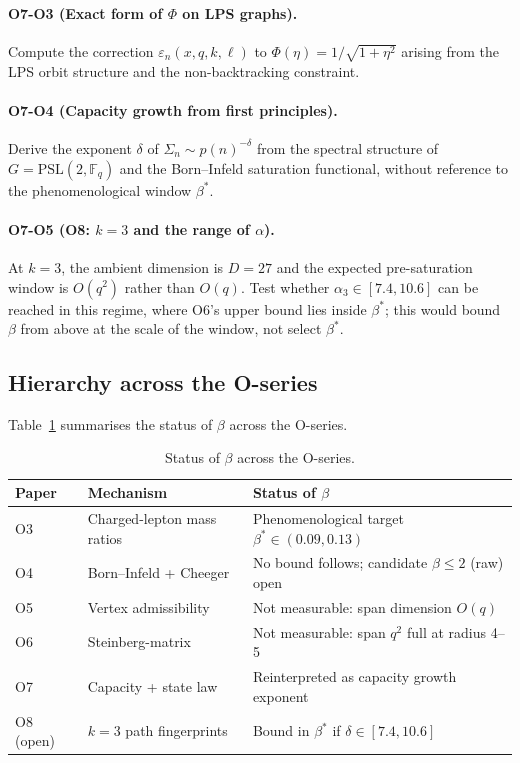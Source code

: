 \documentclass[11pt,a4paper]{article}
\theoremstyle{definition}
\theoremstyle{remark}
\newcommand{\PSL}{\mathrm{PSL}(2,\mathbb{F}_q)}
\begin{document}
    \paragraph{O7-O3 (Exact form of $\Phi$ on LPS graphs).}
      Compute the correction $\varepsilon_n(x,q,k,\ell)$ to $\Phi(\eta) = 1/\sqrt{1+\eta^2}$
      arising from the LPS orbit structure and the non-backtracking constraint.

    \paragraph{O7-O4 (Capacity growth from first principles).}
      Derive the exponent $\delta$ of $\Sigma_n \sim p(n)^{-\delta}$ from the spectral structure
      of $G = \PSL$ and the Born--Infeld saturation functional,
      without reference to the phenomenological window $\beta^*$.

    \paragraph{O7-O5 (O8: $k = 3$ and the range of $\alpha$).}
      At $k = 3$, the ambient dimension is $D = 27$ and the expected pre-saturation window is
      $O(q^2)$ rather than $O(q)$.
      Test whether $\alpha_3 \in [7.4, 10.6]$ can be reached in this regime, where O6's upper bound
      lies inside $\beta^*$; this would bound $\beta$ from above at the scale of the window, not
      select $\beta^*$.

  \subsection{Hierarchy across the O-series}
  \label{ssec:hierarchy-table}

  Table~\ref{tab:hierarchy} summarises the status of $\beta$ across the O-series.

  \begin{table}[ht]
    \centering
    \small
    \caption{Status of $\beta$ across the O-series.}
    \label{tab:hierarchy}
    \begin{tabular}{lll}
      \toprule
      Paper     & Mechanism                  & Status of $\beta$                                 \\
      \midrule
      O3        & Charged-lepton mass ratios & Phenomenological target $\beta^* \in (0.09,0.13)$ \\
      O4        & Born--Infeld + Cheeger     & No bound follows; candidate $\beta \leq 2$ (raw) open \\
      O5        & Vertex admissibility       & Not measurable: span dimension $O(q)$             \\
      O6        & Steinberg-matrix           & Not measurable: span $q^2$ full at radius 4--5    \\
      O7        & Capacity + state law       & Reinterpreted as capacity growth exponent         \\
      O8 (open) & $k=3$ path fingerprints    & Bound in $\beta^*$ if $\delta \in [7.4, 10.6]$     \\
      \bottomrule
    \end{tabular}
  \end{table}
\end{document}
